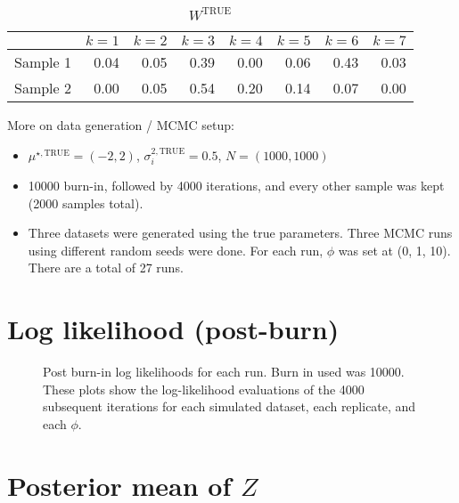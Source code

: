\documentclass[10pt]{article} %
\def\true{\text{TRUE}}
\begin{document}
\begin{table}[ht]
  \centering
  \begin{tabular}{rrrrrrrr}
    \hline
    & $k=1$ & $k=2$ & $k=3$ & $k=4$ & $k=5$ & $k=6$ & $k=7$ \\
    \hline
    Sample 1 & 0.04 & 0.05 & 0.39 & 0.00 & 0.06 & 0.43 & 0.03 \\
    Sample 2 & 0.00 & 0.05 & 0.54 & 0.20 & 0.14 & 0.07 & 0.00 \\
    \hline
  \end{tabular}
  \caption{$W^\true$}
  \label{tab:W-true}
\end{table}

More on data generation / MCMC setup:
\begin{itemize}
  \item $\mu^{\star,\true}=(-2, 2)$, $\sigma^{2,\true}_i=0.5$, $N=(1000, 1000)$
  \item 10000 burn-in, followed by 4000 iterations, and every other sample was
    kept (2000 samples total).
  \item Three datasets were generated using the true parameters. Three MCMC runs using 
    different random seeds were done. For each run, $\phi$ was set at (0, 1, 10). There
    are a total of 27 runs.
\end{itemize}

\newpage
\section{Log likelihood (post-burn)}
\begin{figure}[H]
  \begin{center}  %
  \end{center}
  \caption{Post burn-in log likelihoods for each run. Burn in used was 10000.
  These plots show the log-likelihood evaluations of the 4000 subsequent iterations
  for each simulated dataset, each replicate, and each $\phi$.}
\end{figure}

\newpage
\section{Posterior mean of $Z$}
\begin{figure}[H]
  \begin{center}  %
  \end{center}
\end{figure}
\end{document}
